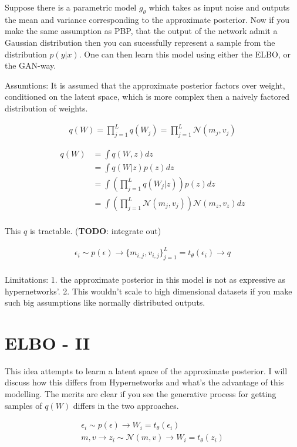 \documentclass[twoside]{article}
\begin{document}
Suppose there is a parametric model $g_\theta$ which takes as input noise and outputs the mean and variance corresponding to the approximate posterior. Now if you make the same assumption as PBP, that the output of the network admit a Gaussian distribution then you can sucessfully represent a sample from the distribution $p(y|x)$. One can then learn this model using either the ELBO, or the GAN-way.

Assumtions: It is assumed that the approximate posterior factors over weight, conditioned on the latent space, which is more complex then a naively factored distribution of weights. 

\begin{align}
q(W) = \prod_{j=1}^Lq(W_j) = \prod_{j=1}^L \mathcal{N}(m_j,v_j)
\end{align}

\begin{align}
q(W) &= \int q(W,z)dz\\
&= \int q(W|z)p(z)dz\\
&= \int \left(\prod_{j=1}^Lq(W_j|z)\right)p(z)dz\\
&= \int \left(\prod_{j=1}^L\mathcal{N}(m_j,v_j)\right)\mathcal{N}(m_z,v_z)dz\\
\end{align}

This $q$ is tractable. (\textbf{TODO}: integrate out)

\begin{align}
\epsilon_i \sim p(\epsilon) \rightarrow \{m_{i,j},v_{i,j}\}_{j=1}^{L} = t_\theta(\epsilon_i) \rightarrow q\\
\end{align}

Limitations: 1. the approximate posterior in this model is not as expressive as hypernetworks'. 2. This wouldn't scale to high dimensional datasets if you make such big assumptions like normally distributed outputs. 

\section{ELBO - II}

This idea attempts to learm a latent space of the approximate posterior. I will discuss how this differs from Hypernetworks and what's the advantage of this modelling. The merits are clear if you see the generative process for getting samples of $q(W)$ differs in the two approaches. 

\begin{align}
\epsilon_i \sim p(\epsilon) \rightarrow W_i = t_\theta(\epsilon_i)\\
m,v \rightarrow z_i \sim \mathcal{N}(m,v) \rightarrow W_i = t_\theta(z_i)
\end{align}
\end{document}
